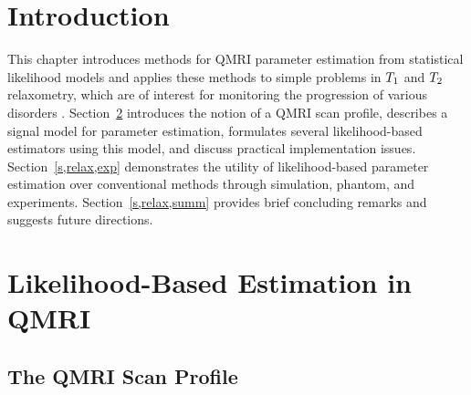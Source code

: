 
\section{Introduction}
\label{s,relax,intro}

This chapter introduces methods
for QMRI parameter estimation
from statistical likelihood models
and applies these methods
to simple problems 
in $T_1$ and $T_2$ relaxometry,
which are of interest
for monitoring the progression
of various disorders \cite{cheng:12:pma}.
Section~\ref{s,relax,meth}
introduces the notion of a QMRI scan profile,
describes a signal model for parameter estimation,
formulates several likelihood-based estimators
using this model,
and discuss practical implementation issues.
Section~\ref{s,relax,exp}
demonstrates the utility
of likelihood-based parameter estimation
over conventional methods
through simulation, phantom, and \invivo experiments.
Section~\ref{s,relax,summ}
provides brief concluding remarks
and suggests future directions.

\section{Likelihood-Based Estimation in QMRI}
\label{s,relax,meth}

\subsection{The QMRI Scan Profile}
\label{ss,relax,meth,prof}

